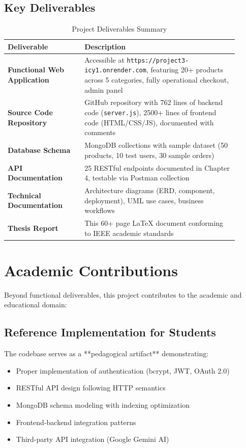 \documentclass[12pt, a4paper]{report}
\begin{document}
\subsection{Key Deliverables}

\begin{table}[H]
\centering
\caption{Project Deliverables Summary}
\label{tab:deliverables_summary}
\begin{tabular}{@{}p{0.30\linewidth}p{0.60\linewidth}@{}}
\toprule
\textbf{Deliverable} & \textbf{Description} \\
\midrule
\textbf{Functional Web Application} & Accessible at \texttt{https://project3-icy1.onrender.com}, featuring 20+ products across 5 categories, fully operational checkout, admin panel \\
\textbf{Source Code Repository} & GitHub repository with 762 lines of backend code (\texttt{server.js}), 2500+ lines of frontend code (HTML/CSS/JS), documented with comments \\
\textbf{Database Schema} & MongoDB collections with sample dataset (50 products, 10 test users, 30 sample orders) \\
\textbf{API Documentation} & 25 RESTful endpoints documented in Chapter 4, testable via Postman collection \\
\textbf{Technical Documentation} & Architecture diagrams (ERD, component, deployment), UML use cases, business workflows \\
\textbf{Thesis Report} & This 60+ page LaTeX document conforming to IEEE academic standards \\
\bottomrule
\end{tabular}
\end{table}

\section{Academic Contributions}

Beyond functional deliverables, this project contributes to the academic and educational domain:

\subsection{Reference Implementation for Students}

The codebase serves as a **pedagogical artifact** demonstrating:
\begin{itemize}
    \item Proper implementation of authentication (bcrypt, JWT, OAuth 2.0)
    \item RESTful API design following HTTP semantics
    \item MongoDB schema modeling with indexing optimization
    \item Frontend-backend integration patterns
    \item Third-party API integration (Google Gemini AI)
\end{itemize}
\end{document}
